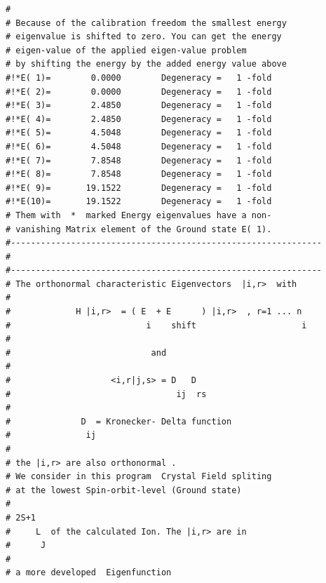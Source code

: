 \begin{enumerate}
{\begin{verbatim}
#                                                              
# Because of the calibration freedom the smallest energy       
# eigenvalue is shifted to zero. You can get the energy        
# eigen-value of the applied eigen-value problem               
# by shifting the energy by the added energy value above       
#!*E( 1)=        0.0000        Degeneracy =   1 -fold            
#!*E( 2)=        0.0000        Degeneracy =   1 -fold            
#!*E( 3)=        2.4850        Degeneracy =   1 -fold            
#!*E( 4)=        2.4850        Degeneracy =   1 -fold            
#!*E( 5)=        4.5048        Degeneracy =   1 -fold            
#!*E( 6)=        4.5048        Degeneracy =   1 -fold            
#!*E( 7)=        7.8548        Degeneracy =   1 -fold            
#!*E( 8)=        7.8548        Degeneracy =   1 -fold            
#!*E( 9)=       19.1522        Degeneracy =   1 -fold            
#!*E(10)=       19.1522        Degeneracy =   1 -fold            
# Them with  *  marked Energy eigenvalues have a non-          
# vanishing Matrix element of the Ground state E( 1).          
#-------------------------------------------------------------- 
#
#-------------------------------------------------------------- 
# The orthonormal characteristic Eigenvectors  |i,r>  with     
#                                                              
#             H |i,r>  = ( E  + E      ) |i,r>  , r=1 ... n    
#                           i    shift                     i   
#                                                              
#                            and                               
#                                                              
#                    <i,r|j,s> = D   D                         
#                                 ij  rs                       
#                                                              
#              D  = Kronecker- Delta function                  
#               ij                                             
#                                                              
# the |i,r> are also orthonormal .                             
# We consider in this program  Crystal Field spliting          
# at the lowest Spin-orbit-level (Ground state)                
#                                                              
# 2S+1                                                         
#     L  of the calculated Ion. The |i,r> are in               
#      J                                                       
#                                                              
# a more developed  Eigenfunction   			    

\end{verbatim}}
\end{enumerate}

